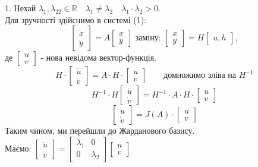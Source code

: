1. Нехай $\lambda_1 , \lambda_22 \in \mathbb{R} \quad \lambda_1 \neq \lambda_2 \quad \lambda_1 \cdot \lambda_2 > 0.$\\ Для зручності здійснимо в системі (1):
$$
\begin{bmatrix}
 \dot{x}\\
 \dot{y}
\end{bmatrix} = A \begin{bmatrix}
 x \\
 y
\end{bmatrix} \text{ заміну: } \begin{bmatrix}
 x\\
 y
\end{bmatrix} = H \begin{bmatrix}
 u, h
\end{bmatrix},
$$
де $\begin{bmatrix}
 u \\
 v
\end{bmatrix}$ - нова невідома вектор-функція.
$$
H \cdot \begin{bmatrix}
 \dot{u}\\
 \dot{v}
\end{bmatrix} = A \cdot H \cdot \begin{bmatrix}
 u \\
 v
\end{bmatrix} \qquad \text{домножимо зліва на } H^{-1}
$$
$$
H^{-1} \cdot H \begin{bmatrix}
\dot{u}\\
\dot{v}
\end{bmatrix}  =H^{-1} \cdot A \cdot H \cdot \begin{bmatrix}
 u \\
 v
\end{bmatrix}
$$
$$
\begin{bmatrix}
\dot{u}\\
\dot{v}
\end{bmatrix}  =J(A) \cdot \begin{bmatrix}
 u \\
 v
\end{bmatrix}
$$
Таким чином, ми перейшли до Жарданового базису.\\
Маємо: $ \begin{bmatrix}
\dot{u}\\
\dot{v}
\end{bmatrix} = \begin{bmatrix}
 \lambda_1 & 0 \\
 0 & \lambda_2
\end{bmatrix} \begin{bmatrix}
 u \\
 v
\end{bmatrix}$

